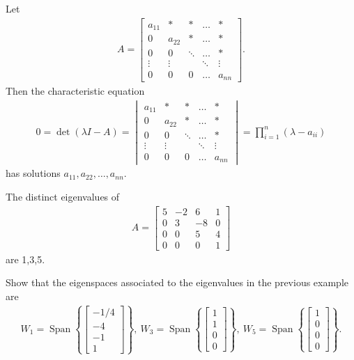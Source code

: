 \documentclass[12pt,letterpaper,reqno]{article}
\numberwithin{equation}{section}
\DeclareMathOperator{\Span}{Span}
\begin{document}
\begin{pf}
Let 
\begin{align*}
	A=\begin{bmatrix}
		a_{11} & * & * & \dots & * \\
		0 & a_{22} & * & \dots & * \\
		0 & 0 & \ddots & \dots & * \\
		\vdots  & \vdots  &        & \ddots & \vdots  \\
		0 & 0 & 0 & \dots & a_{nn}
	\end{bmatrix}.
\end{align*}	
Then the characteristic equation  
\begin{align*}
0=\det(\lambda I-A)=\begin{vmatrix}
		a_{11} & * & * & \dots & * \\
		0 & a_{22} & * & \dots & * \\
		0 & 0 & \ddots & \dots & * \\
		\vdots  & \vdots  &        & \ddots & \vdots  \\
		0 & 0 & 0 & \dots & a_{nn}
	\end{vmatrix}=\prod_{i=1}^n(\lambda-a_{ii})
\end{align*}
has solutions $a_{11}, a_{22},\dots,a_{nn}$.
\end{pf}

\begin{example}
The distinct eigenvalues of
\begin{align*}
	A=\begin{bmatrix}
		5 & -2 & 6 & 1 \\
		0 & 3 & -8 & 0 \\
		0 & 0 & 5 & 4 \\
		0 & 0 & 0 & 1
	\end{bmatrix}
\end{align*}	
are 1,3,5.
\end{example}

\begin{exercise}
Show that the eigenspaces associated to the eigenvalues in the previous example are
\begin{align*}
	W_1=\Span\left\{\begin{bmatrix}
		-1/4 \\ -4 \\ -1 \\ 1
	\end{bmatrix}\right\}, \ W_3=\Span\left\{\begin{bmatrix}
		1 \\ 1 \\ 0 \\ 0
	\end{bmatrix}\right\}, \ W_5=\Span\left\{\begin{bmatrix}
		1 \\ 0 \\ 0 \\ 0
	\end{bmatrix}\right\}.
\end{align*}	
\end{exercise}
\end{document}
